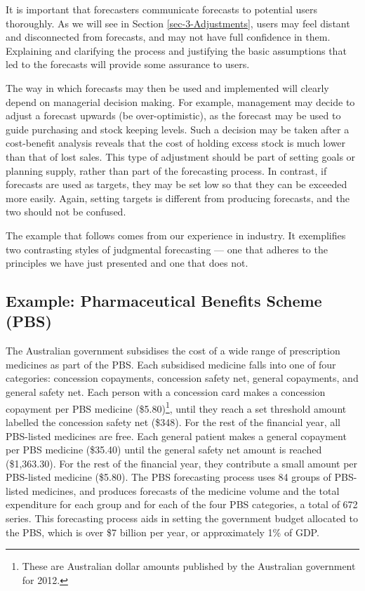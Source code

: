 \documentclass[]{book}
\let\rmarkdownfootnote\footnote%
\def\footnote{\protect\rmarkdownfootnote}
\begin{document}
It is important that forecasters communicate forecasts to potential users thoroughly. As we will see in Section \ref{sec-3-Adjustments}, users may feel distant and disconnected from forecasts, and may not have full confidence in them. Explaining and clarifying the process and justifying the basic assumptions that led to the forecasts will provide some assurance to users.

The way in which forecasts may then be used and implemented will clearly depend on managerial decision making. For example, management may decide to adjust a forecast upwards (be over-optimistic), as the forecast may be used to guide purchasing and stock keeping levels. Such a decision may be taken after a cost-benefit analysis reveals that the cost of holding excess stock is much lower than that of lost sales. This type of adjustment should be part of setting goals or planning supply, rather than part of the forecasting process. In contrast, if forecasts are used as targets, they may be set low so that they can be exceeded more easily. Again, setting targets is different from producing forecasts, and the two should not be confused.

The example that follows comes from our experience in industry. It exemplifies two contrasting styles of judgmental forecasting --- one that adheres to the principles we have just presented and one that does not.

\hypertarget{example-pharmaceutical-benefits-scheme-pbs}{%
\subsection*{Example: Pharmaceutical Benefits Scheme (PBS)}\label{example-pharmaceutical-benefits-scheme-pbs}}

The Australian government subsidises the cost of a wide range of prescription medicines as part of the PBS. Each subsidised medicine falls into one of four categories: concession copayments, concession safety net, general copayments, and general safety net. Each person with a concession card makes a concession copayment per PBS medicine (\$5.80)\footnote{These are Australian dollar amounts published by the Australian government for 2012.},
until they reach a set threshold amount labelled the concession safety net (\$348). For the rest of the financial year, all PBS-listed medicines are free. Each general patient makes a general copayment per PBS medicine (\$35.40) until the general safety net amount is reached (\$1,363.30). For the rest of the financial year, they contribute a small amount per PBS-listed medicine (\$5.80). The PBS forecasting process uses 84 groups of PBS-listed medicines, and produces forecasts of the medicine volume and the total expenditure for each group and for each of the four PBS categories, a total of 672 series. This forecasting process aids in setting the government budget allocated to the PBS, which is over \$7 billion per year, or approximately 1\% of GDP.
\end{document}
